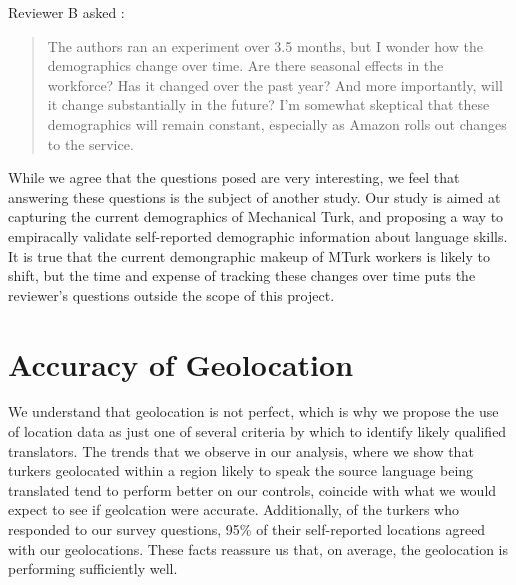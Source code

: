 \documentclass[11pt]{article}
\begin{document}
Reviewer B asked : 
\begin{quote}
The authors ran an experiment over 3.5 months, but I wonder how the demographics change over time. Are there seasonal effects in the workforce? Has it changed over the past year? And more importantly, will it change substantially in the future? I'm somewhat skeptical that these demographics will remain constant, especially as Amazon rolls out changes to the service.
\end{quote}

While we agree that the questions posed are very interesting, we feel that answering these questions is the subject of another study. Our study is aimed at capturing the current demographics of Mechanical Turk, and proposing a way to empiracally validate self-reported demographic information about language skills. It is true that the current demongraphic makeup of MTurk workers is likely to shift, but the time and expense of tracking these changes over time puts the reviewer's questions outside the scope of this project.

\section{Accuracy of Geolocation}

We understand that geolocation is not perfect, which is why we propose the use of location data as just one of several criteria by which to identify likely qualified translators. The trends that we observe in our analysis, where we show that turkers geolocated within a region likely to speak the source language being translated tend to perform better on our controls, coincide with what we would expect to see if geolcation were accurate. Additionally, of the turkers who responded to our survey questions, 95\% of their self-reported locations agreed with our geolocations. These facts reassure us that, on average, the geolocation is performing sufficiently well.
\end{document}
